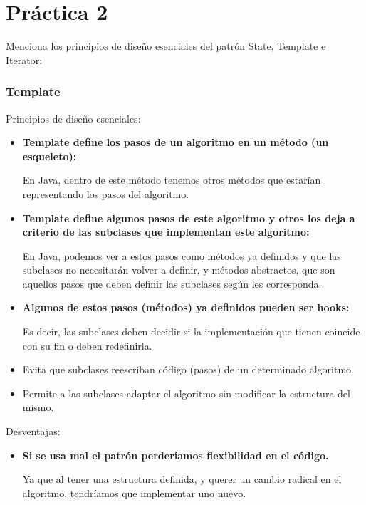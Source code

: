 \documentclass{article}
\begin{document}
	
	\section*{\LARGE{Práctica 2}}

Menciona los principios de diseño esenciales del patrón State, Template e Iterator:

\subsubsection*{Template}
Principios de diseño esenciales:
\newcommand{\localtextbulletone}{\textcolor{black}{\raisebox{.45ex}{\rule{.6ex}{.6ex}}}}
\renewcommand{\labelitemi}{\localtextbulletone}
\begin{itemize}
\item \textbf{Template define los pasos de un algoritmo en un método (un esqueleto):}
  
  En Java, dentro de este método tenemos otros métodos que estarían representando los
  pasos del algoritmo.
\item \textbf{Template define algunos pasos de este algoritmo y otros los deja a
  criterio de las subclases que implementan este algoritmo:}
  
  En Java, podemos ver a estos pasos como métodos ya definidos y que las subclases no
  necesitarán volver a definir, y métodos abstractos, que son aquellos pasos que deben
  definir las subclases según les corresponda.

\item \textbf{Algunos de estos pasos (métodos) ya definidos pueden ser hooks:}
  
  Es decir, las subclases deben decidir si la implementación que tienen coincide
  con su fin o deben redefinirla.
  
\item Evita que subclases reescriban código (pasos) de un determinado algoritmo.
\item Permite a las subclases adaptar el algoritmo sin modificar la estructura del mismo.
\end{itemize}

Desventajas:
\begin{itemize}
\item \textbf{Si se usa mal el patrón perderíamos flexibilidad en el código.}
  
  Ya que al tener una estructura definida, y querer un cambio radical en el algoritmo,
  tendríamos que implementar uno nuevo.  
\end{itemize}
\end{document}
